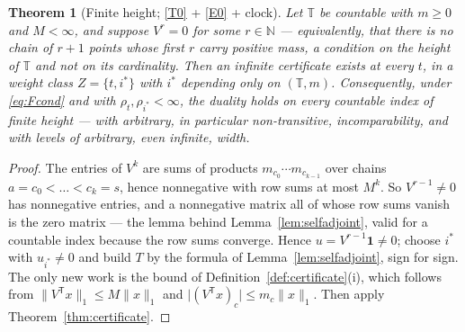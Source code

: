 \documentclass[11pt,a4paper]{article}
\theoremstyle{plain}
\newtheorem{theorem}{Theorem}[section]
\theoremstyle{definition}
\theoremstyle{remark}
\newcommand{\N}{\mathbb{N}}
\newcommand{\T}{\mathbb{T}}                     %
\newcommand{\one}{\mathbf{1}}
\begin{document}
\begin{theorem}[Finite height; \eqref{T0} + \eqref{E0} + clock]
  \label{thm:finiteheight}
  Let $\T$ be countable with $m \geq 0$ and $M < \infty$, and suppose
  $V^r = 0$ for some $r \in \N$ --- equivalently, that there is no chain of
  $r+1$ points whose first $r$ carry positive mass, a condition on the
  \emph{height} of $\T$ and not on its cardinality.  Then an infinite
  certificate exists at every $t$, in a weight class $Z = \{t, i^*\}$ with $i^*$
  depending only on $(\T,m)$.  Consequently, under \eqref{eq:Fcond} and with
  $\rho_t, \rho_{i^*} < \infty$, the duality holds on every countable index of
  finite height --- with arbitrary, in particular non-transitive,
  incomparability, and with levels of arbitrary, even infinite, width.
\end{theorem}

\begin{proof}
  The entries of $V^k$ are sums of products $m_{c_0}\cdots m_{c_{k-1}}$ over
  chains $a = c_0 < \dots < c_k = s$, hence nonnegative with row sums at most
  $M^k$.  So $V^{r-1} \neq 0$ has nonnegative entries, and a nonnegative matrix
  all of whose row sums vanish is the zero matrix --- the lemma behind
  Lemma~\ref{lem:selfadjoint}, valid for a countable index because the row sums
  converge.  Hence $u = V^{r-1}\one \neq 0$; choose $i^*$ with $u_{i^*} \neq 0$
  and build $T$ by the formula of Lemma~\ref{lem:selfadjoint}, sign for sign.
  The only new work is the bound of Definition~\ref{def:certificate}(i), which
  follows from $\lVert V^{\mathsf T}x\rVert_1 \leq M \lVert x\rVert_1$ and
  $\lvert (V^{\mathsf T}x)_c\rvert \leq m_c \lVert x\rVert_1$.  Then apply
  Theorem~\ref{thm:certificate}.
\end{proof}
\end{document}
